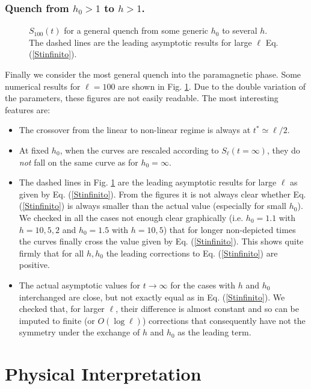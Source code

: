 \subsubsection{Quench from $h_0>1$ to $h>1$.}

\begin{figure}[t]
\centerline{}
\caption{$S_{100}(t)$ for a general quench from some generic $h_0$ to several 
$h$.
The dashed lines are the leading asymptotic results for large $\ell$ 
Eq. (\ref{Stinfinito}).}
\label{SLhho}
\end{figure}

Finally we consider the most general quench into the paramagnetic phase.
Some numerical results for $\ell=100$ are shown in Fig. \ref{SLhho}. 
Due to the double variation of the parameters, these figures are not easily 
readable. The most interesting features are:
\begin{itemize}
\item The crossover from the linear to non-linear regime is 
always at $t^*\simeq \ell/2$.

\item At fixed $h_0$, when the curves are rescaled according to 
$S_\ell(t=\infty)$, they do {\em not} fall on the same curve as for $h_0=\infty$.


\item The dashed lines in Fig. \ref{SLhho} are the leading asymptotic results
for large $\ell$ as given by Eq. (\ref{Stinfinito}).
From the figures it is not always clear whether Eq. (\ref{Stinfinito}) is 
always smaller than the actual value (especially for small $h_0$).
We checked in all the cases not enough clear graphically (i.e. $h_0=1.1$ with
$h=10,5,2$ and $h_0=1.5$ with $h=10,5$) that for longer non-depicted times
the curves finally cross the value given by Eq. (\ref{Stinfinito}).
This shows quite firmly that for all $h,h_0$ the leading corrections to 
Eq. (\ref{Stinfinito}) are positive.
\item The actual asymptotic values for $t\rightarrow\infty$ for the cases 
with $h$ and $h_0$ interchanged are close, but not exactly equal as in 
Eq. (\ref{Stinfinito}). 
We checked that, for larger $\ell$, their difference is almost constant and 
so can be imputed to finite (or $O(\log \ell)$) corrections that consequently 
have not the symmetry under the exchange of $h$ and $h_0$ as the leading term.
\end{itemize}

\section{Physical Interpretation}
\label{arg}


